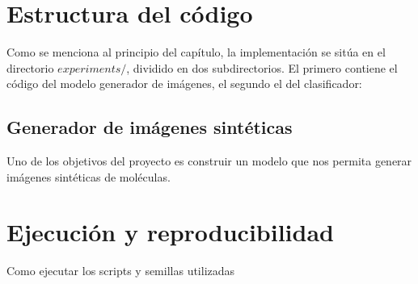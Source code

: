 \section{Estructura del código}
Como se menciona al principio del capítulo, la implementación se sitúa en el directorio $experiments/$, dividido en dos subdirectorios. El primero contiene el código del modelo generador de imágenes, el segundo el del clasificador: \\


\subsection{Generador de imágenes sintéticas}
Uno de los objetivos del proyecto es construir un modelo que nos permita generar imágenes sintéticas de moléculas. 

\section{Ejecución y reproducibilidad}
Como ejecutar los scripts y semillas utilizadas